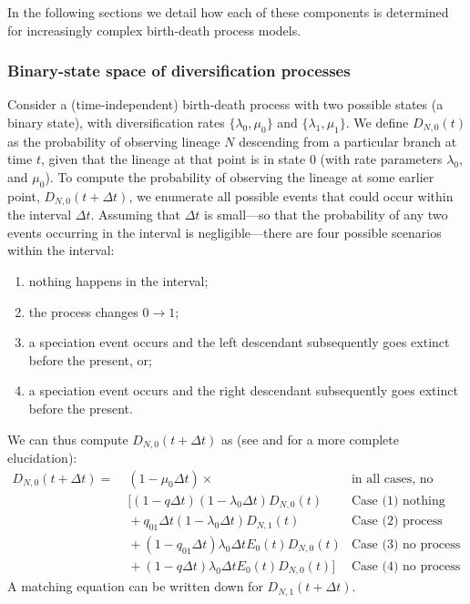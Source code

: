 In the following sections we detail how each of these components is determined for increasingly complex birth-death process models.


\subsubsection{Binary-state space of diversification processes}
Consider a (time-independent) birth-death process with two possible states (\EG a binary state), with diversification rates $\{\lambda_0, \mu_0\}$ and $\{\lambda_1, \mu_1\}$.
We define $D_{N,0}(t)$ as the probability of observing lineage $N$ descending from a particular branch at time $t$, given that the lineage at that point is in state 0 (with rate parameters $\lambda_{0}$, and $\mu_{0}$).
To compute the probability of observing the lineage at some earlier point, $ D_{N,0}(t + \Delta t)$, we enumerate all possible events that could occur within the interval $\Delta t$.
Assuming that $\Delta t$ is small---so that the probability of any two events occurring in the interval is negligible---there are four possible scenarios within the interval:
\begin{enumerate}
	\item nothing happens in the interval;
	\item the process changes $0 \rightarrow 1$;
	\item a speciation event occurs and the left descendant subsequently goes extinct before the present, or;
	\item a speciation event occurs and the right descendant subsequently goes extinct before the present.
\end{enumerate}
We can thus compute $D_{N,0}(t + \Delta t)$ as (see \cite{Maddison2007} and \cite{FitzJohn2009} for a more complete elucidation):
\begin{align}
	D_{N,0}(t + \Delta t) = & \;(1 - \mu_0\Delta t) \times & \text{in all cases, no extinction of the observed lineage} \label{equation:ProbDeltaT} \\
			    		   & \;[  (1 - q\Delta t)(1 - \lambda_0\Delta t)D_{N,0}(t) & \text{Case (1) nothing happens} \nonumber\\
						   & \; + q_{01}\Delta t (1 - \lambda_0\Delta t)D_{N,1}(t) & \text{Case (2) process change but no speciation} \nonumber\\
						   & \; + (1 - q_{01}\Delta t)\lambda_0\Delta t E_0(t)D_{N,0}(t) & \text{Case (3) no process change, speciation, extinction} \nonumber\\
						   & \; + (1 - q\Delta t)\lambda_0\Delta t E_0(t)D_{N,0}(t)] & \text{Case (4) no process change, speciation, extinction} \nonumber
\end{align}
A matching equation can be written down for $D_{N,1}(t+\Delta t)$.

